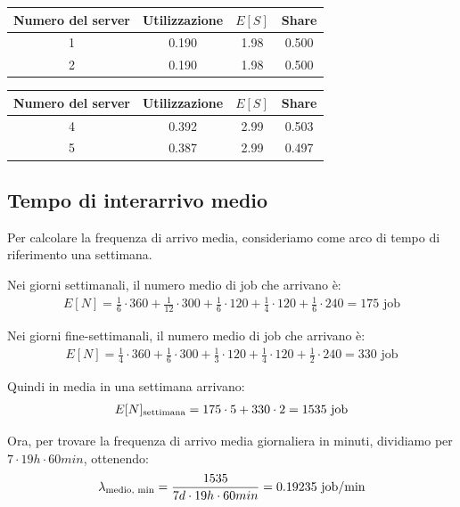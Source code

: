 \documentclass[a4paper, 12pt]{article}
\begin{document}
\begin{center}
\begin{tabular}{ |c|c|c|c| }
  \hline
  Numero del server & Utilizzazione & $E[S]$ & Share \\
  \hline
  \hline
  1 & 0.190 & 1.98 & 0.500 \\
  \hline
  2 & 0.190 & 1.98 & 0.500 \\
  \hline
\end{tabular}
\begin{tabular}{ |c|c|c|c| }
  \hline
  Numero del server & Utilizzazione & $E[S]$ & Share \\
  \hline
  \hline
  4 & 0.392 & 2.99 & 0.503 \\
  \hline
  5 & 0.387 & 2.99 & 0.497 \\
  \hline
\end{tabular}
\end{center}

\bigskip
\subsection{Tempo di interarrivo medio}
Per calcolare la frequenza di arrivo media, consideriamo come arco di tempo di
riferimento una settimana. \newline

Nei giorni settimanali, il numero medio di job che arrivano è:
\[
\begin{aligned}
   E[N] = \frac{1}{6} \cdot 360 + \frac{1}{12}\cdot 300 + \frac{1}{6} \cdot 120
+ \frac{1}{4} \cdot 120 +\frac{1}{6} \cdot 240 = 175 \text{ job}
\end{aligned}
\]

Nei giorni fine-settimanali, il numero medio di job che arrivano è:
\[
\begin{aligned}
  E[N] = \frac{1}{4} \cdot 360 + \frac{1}{6}\cdot 300 + \frac{1}{3} \cdot 120
+ \frac{1}{4} \cdot 120 +\frac{1}{2} \cdot 240 = 330 \text{ job} 
\end{aligned}
\]

Quindi in media in una settimana arrivano:
\[
\begin{aligned}
  E[N]\textsubscript{settimana} = 175 \cdot 5 + 330 \cdot 2 = 1535\text{ job}
\end{aligned}
\]

Ora, per trovare la frequenza di arrivo media giornaliera in minuti, dividiamo
per $7 \cdot 19h \cdot 60min$, ottenendo:
\[
\begin{aligned}
  \lambda\textsubscript{medio, min} = \frac{1535}{7d \cdot 19h \cdot 60min}
= 0.19235 \text{ job/min}
\end{aligned}
\]
\end{document}
